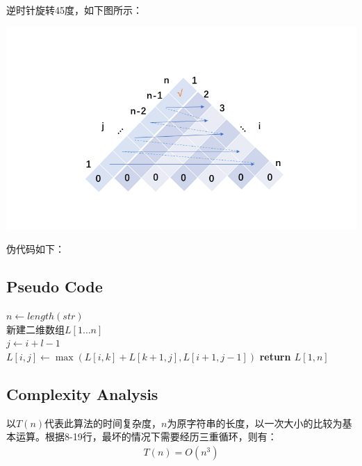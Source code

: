 \documentclass{ctexart}
\begin{document}
逆时针旋转45度，如下图所示：

\includegraphics[width=1.1\textwidth]{幻灯片4.PNG}

伪代码如下：

\subsection{Pseudo Code}

\begin{algorithm}[H]
    \SetAlgoLined %
	\caption{$Longest-Legal-Subsequences(str)$}%
	\BlankLine
	\BlankLine
	$n \leftarrow length(str)$ \\
	新建二维数组$L[1 \ldots n]$ \\
    {
    {
    $j \leftarrow i+l-1$ \\
    {
    {
    $L[i,j] \leftarrow \max(L[i,k]+L[k+1,j],L[i+1,j-1])$
    }
    }
    }
    }
	\textbf{return $L[1,n]$}
\end{algorithm}


\subsection{Complexity Analysis}

以$T(n)$代表此算法的时间复杂度，$n$为原字符串的长度，以一次大小的比较为基本运算。根据8-19行，最坏的情况下需要经历三重循环，则有：
\begin{align*}
    T(n) = O(n^3)
\end{align*}
\end{document}
